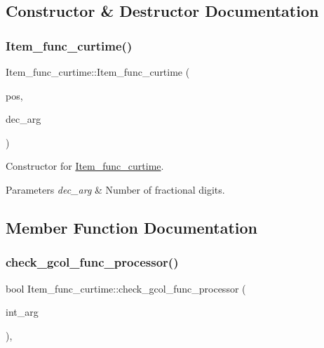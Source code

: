 \subsection{Constructor \& Destructor Documentation}
\mbox{\label{classItem__func__curtime_a879e2c5a9c2f4791640cc19221a7dfd7}} 
\subsubsection{\texorpdfstring{Item\+\_\+func\+\_\+curtime()}{Item\_func\_curtime()}}
{\footnotesize\ttfamily Item\+\_\+func\+\_\+curtime\+::\+Item\+\_\+func\+\_\+curtime (\begin{DoxyParamCaption}\item[{const \mbox{\hyperlink{structYYLTYPE}{P\+OS}} \&}]{pos,  }\item[{uint8}]{dec\+\_\+arg }\end{DoxyParamCaption})\hspace{0.3cm}{\ttfamily [inline]}}

Constructor for \mbox{\hyperlink{classItem__func__curtime}{Item\+\_\+func\+\_\+curtime}}. 
\begin{DoxyParams}{Parameters}
{\em dec\+\_\+arg} & Number of fractional digits. \\
\hline
\end{DoxyParams}


\subsection{Member Function Documentation}
\mbox{\label{classItem__func__curtime_af861f93c4face56168852e5cdb465e43}} 
\subsubsection{\texorpdfstring{check\+\_\+gcol\+\_\+func\+\_\+processor()}{check\_gcol\_func\_processor()}}
{\footnotesize\ttfamily bool Item\+\_\+func\+\_\+curtime\+::check\+\_\+gcol\+\_\+func\+\_\+processor (\begin{DoxyParamCaption}\item[{uchar $\ast$}]{int\+\_\+arg }\end{DoxyParamCaption})\hspace{0.3cm}{\ttfamily [inline]}, {\ttfamily [virtual]}}

